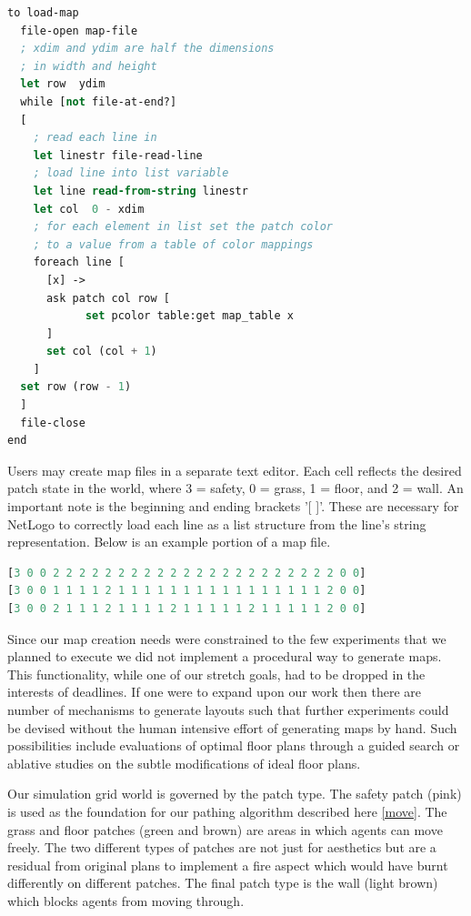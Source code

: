 \documentclass[12pt,letterpaper]{article}
\begin{document}
\begin{lstlisting}[language=lisp, caption={Map loading procedure in NetLogo},captionpos=b, frame=single]
to load-map
  file-open map-file
  ; xdim and ydim are half the dimensions
  ; in width and height
  let row  ydim
  while [not file-at-end?]
  [
    ; read each line in	
    let linestr file-read-line
    ; load line into list variable
    let line read-from-string linestr
    let col  0 - xdim
    ; for each element in list set the patch color 
    ; to a value from a table of color mappings
    foreach line [      
      [x] ->
      ask patch col row [ 
            set pcolor table:get map_table x 
      ]
      set col (col + 1)
    ]
  set row (row - 1)
  ]
  file-close
end
\end{lstlisting}

Users may create map files in a separate text editor. Each cell reflects the desired patch state in the world, where 3 = safety, 0 = grass, 1 = floor, and 2 = wall. An important note is the beginning and ending brackets '[ ]'.  These are necessary for NetLogo to correctly load each line as a list structure from the line's string representation.  Below is an example portion of a map file.  

\begin{lstlisting}[language=lisp, caption={Example map file, 3 rows},captionpos=b, frame=single]
[3 0 0 2 2 2 2 2 2 2 2 2 2 2 2 2 2 2 2 2 2 2 2 2 2 0 0]
[3 0 0 1 1 1 1 2 1 1 1 1 1 1 1 1 1 1 1 1 1 1 1 1 2 0 0]
[3 0 0 2 1 1 1 2 1 1 1 1 2 1 1 1 1 1 2 1 1 1 1 1 2 0 0]
\end{lstlisting}

Since our map creation needs were constrained to the few experiments that we planned to execute we did not implement a procedural way to generate maps.  This functionality, while one of our stretch goals, had to be dropped in the interests of deadlines.  If one were to expand upon our work then there are number of mechanisms to generate layouts \cite{mirahmadiNovelAlgorithmRealtime2012} such that further experiments could be devised without the human intensive effort of generating maps by hand.  Such possibilities include evaluations of optimal floor plans through a guided search or ablative studies on the subtle modifications of ideal floor plans.

Our simulation grid world is governed by the patch type.  The safety patch (pink) is used as the foundation for our pathing algorithm described here \ref{move}.  The grass and floor patches (green and brown) are areas in which agents can  move freely.  The two different types of patches are not just for aesthetics but are a residual from original plans to implement a fire aspect which would have burnt differently on different patches.  The final patch type is the wall (light brown) which blocks agents from moving through.
\end{document}
